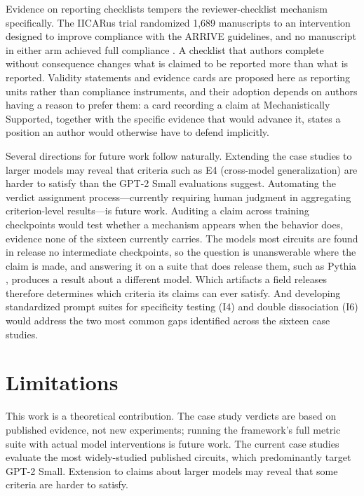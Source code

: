 \documentclass{article}
\begin{document}
Evidence on reporting checklists tempers the reviewer-checklist mechanism specifically. The IICARus trial randomized 1{,}689 manuscripts to an intervention designed to improve compliance with the ARRIVE guidelines, and no manuscript in either arm achieved full compliance \citep{hair2019randomised}. A checklist that authors complete without consequence changes what is claimed to be reported more than what is reported. Validity statements and evidence cards are proposed here as reporting units rather than compliance instruments, and their adoption depends on authors having a reason to prefer them: a card recording a claim at Mechanistically Supported, together with the specific evidence that would advance it, states a position an author would otherwise have to defend implicitly.

Several directions for future work follow naturally. Extending the case studies to larger models may reveal that criteria such as E4 (cross-model generalization) are harder to satisfy than the GPT-2 Small evaluations suggest. Automating the verdict assignment process---currently requiring human judgment in aggregating criterion-level results---is future work. Auditing a claim across training checkpoints would test whether a mechanism appears when the behavior does, evidence none of the sixteen currently carries. The models most circuits are found in release no intermediate checkpoints, so the question is unanswerable where the claim is made, and answering it on a suite that does release them, such as Pythia \citep{biderman2023pythia}, produces a result about a different model. Which artifacts a field releases therefore determines which criteria its claims can ever satisfy. And developing standardized prompt suites for specificity testing (I4) and double dissociation (I6) would address the two most common gaps identified across the sixteen case studies.

\section{Limitations}
\label{sec:limitations}

This work is a theoretical contribution. The case study verdicts are based on published evidence, not new experiments; running the framework's full metric suite with actual model interventions is future work. The current case studies evaluate the most widely-studied published circuits, which predominantly target GPT-2 Small. Extension to claims about larger models may reveal that some criteria are harder to satisfy.
\end{document}
